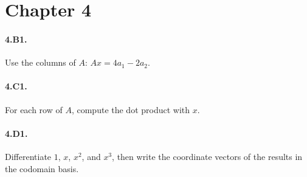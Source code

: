 \section*{Chapter 4}

\paragraph{4.B1.}
Use the columns of $A$: $Ax=4a_1-2a_2$.

\paragraph{4.C1.}
For each row of $A$, compute the dot product with $x$.

\paragraph{4.D1.}
Differentiate $1$, $x$, $x^2$, and $x^3$, then write the coordinate vectors of
the results in the codomain basis.
